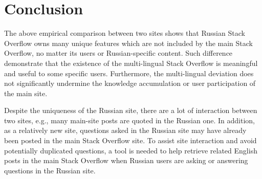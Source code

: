 \section{Conclusion}
The above empirical comparison between two sites shows that Russian Stack Overflow owns many unique features which are not included by the main Stack Overflow, no matter its users or Russian-specific content.
Such difference demonstrate that the existence of the multi-lingual Stack Overflow is meaningful and useful to some specific users.
Furthermore, the multi-lingual deviation does not significantly undermine the knowledge accumulation or user participation of the main site.

Despite the uniqueness of the Russian site, there are a lot of interaction between two sites, e.g., many main-site posts are quoted in the Russian one.
In addition, as a relatively new site, questions asked in the Russian site may have already been posted in the main Stack Overflow site.
To assist site interaction and avoid potentially duplicated questions, a tool is needed to help retrieve related English posts in the main Stack Overflow when Russian users are asking or answering questions in the Russian site.

